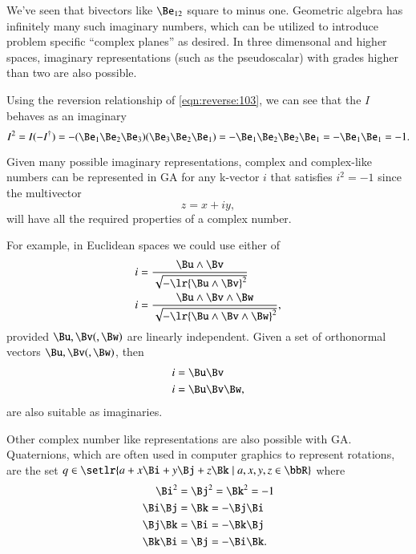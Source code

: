 %
%
We've seen that bivectors like \( \Be_{12} \) square to minus one.
Geometric algebra has infinitely many such imaginary numbers, which can be utilized to introduce problem specific ``complex planes'' as desired.
In three dimensonal and higher spaces, imaginary representations
(such as the  pseudoscalar) with grades higher than two are also possible.

Using the reversion relationship of \cref{eqn:reverse:103}, we can see that the \( I \) behaves as an imaginary
\begin{dmath}\label{eqn:complex:3310}
I^2
=
I (-I^\dagger)
=
-
(\Be_1 \Be_2 \Be_3)(\Be_3 \Be_2 \Be_1)
=
-
\Be_1 \Be_2 \Be_2 \Be_1
=
-
\Be_1 \Be_1
=
-1.
\end{dmath}

Given many possible imaginary representations, complex and complex-like numbers can be represented in GA for any k-vector \( i \) that satisfies \( i^2 = -1 \) since the multivector
\begin{dmath}\label{eqn:complex:260}
z = x + i y,
\end{dmath}
will have all the required properties of a complex number.

For example, in Euclidean spaces we could use either of
\begin{dmath}\label{eqn:complex:280}
\begin{aligned}
i &= \frac{\Bu \wedge \Bv}{\sqrt{-\lr{\Bu\wedge\Bv}^2}} \\
i &= \frac{\Bu \wedge \Bv \wedge \Bw}{\sqrt{-\lr{\Bu\wedge\Bv\wedge \Bw}^2}},
\end{aligned}
\end{dmath}
provided \( \Bu, \Bv (,\Bw) \) are linearly independent.
Given a set of orthonormal vectors \( \Bu, \Bv (,\Bw) \), then
\begin{dmath}\label{eqn:complex:300}
\begin{aligned}
i &= \Bu \Bv \\
i &= \Bu \Bv \Bw,
\end{aligned}
\end{dmath}
are also suitable as imaginaries.

Other complex number like representations are also possible with GA.
Quaternions, which are often used in computer graphics to represent rotations,
are the set \( q \in \setlr{ a + x \Bi + y \Bj + z \Bk \mid a, x, y, z \in \bbR} \) where
\begin{equation}\label{eqn:quaternion2maxwellWithGA:240}
\begin{aligned}
\Bi^2 &= \Bj^2 = \Bk^2 = -1 \\
\Bi \Bj &= \Bk = -\Bj \Bi \\
\Bj \Bk &= \Bi = -\Bk \Bj \\
\Bk \Bi &= \Bj = -\Bi \Bk.
\end{aligned}
\end{equation}

